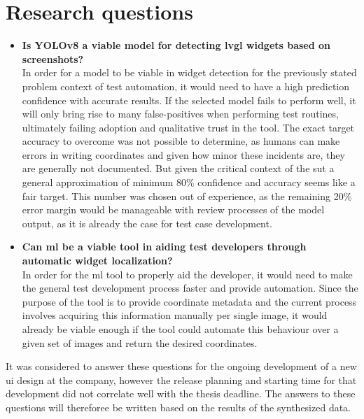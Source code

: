 \documentclass[Bachelor, BIC, english, fhCitStyle, IEEE]{BASE/twbook} %
\begin{document}
\chapter{Research questions}
\begin{itemize}
    \item \textbf{Is YOLOv8 a viable model for detecting \ac{lvgl} widgets based on screenshots?}\\
    In order for a model to be viable in widget detection for the previously stated problem context of test automation, it would need to have a high prediction confidence with accurate results. If the selected model fails to perform well, it will only bring rise to many false-positives when performing test routines, ultimately failing adoption and qualitative trust in the tool. The exact target accuracy to overcome was not possible to determine, as humans can make errors in writing coordinates and given how minor these incidents are, they are generally not documented. But given the critical context of the \ac{sut} a general approximation of minimum 80\% confidence and accuracy seems like a fair target. This number was chosen out of experience, as the remaining 20\% error margin would be manageable with review processes of the model output, as it is already the case for test case development.
    \item \textbf{Can \ac{ml} be a viable tool in aiding test developers through automatic widget localization?}\\
    In order for the \ac{ml} tool to properly aid the developer, it would need to make the general test development process faster and provide automation. Since the purpose of the tool is to provide coordinate metadata and the current process involves acquiring this information manually per single image, it would already be viable enough if the tool could automate this behaviour over a given set of images and return the desired coordinates.
\end{itemize}
It was considered to answer these questions for the ongoing development of a new \ac{ui} design at the company, however the release planning and starting time for that development did not correlate well with the thesis deadline. The answers to these questions will thereforee be written based on the results of the synthesized data.
\clearpage
\end{document}
